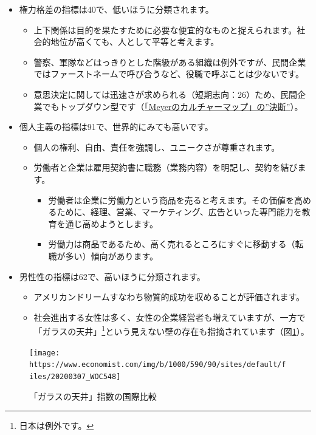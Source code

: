 \documentclass[
]{book}
\begin{document}
\begin{itemize}
\item
  権力格差の指標は40で、低いほうに分類されます。

  \begin{itemize}
  \item
    上下関係は目的を果たすために必要な便宜的なものと捉えられます。社会的地位が高くても、人として平等と考えます。
  \item
    警察、軍隊などはっきりとした階級がある組織は例外ですが、民間企業ではファーストネームで呼び合うなど、役職で呼ぶことは少ないです。
  \item
    意思決定に関しては迅速さが求められる（短期志向：26）ため、民間企業でもトップダウン型です（\protect\hyperlink{meyer}{「Meyerのカルチャーマップ」の''決断''}）。
  \end{itemize}
\item
  個人主義の指標は91で、世界的にみても高いです。

  \begin{itemize}
  \item
    個人の権利、自由、責任を強調し、ユニークさが尊重されます。
  \item
    労働者と企業は雇用契約書に職務（業務内容）を明記し、契約を結びます。

    \begin{itemize}
    \item
      労働者は企業に労働力という商品を売ると考えます。その価値を高めるために、経理、営業、マーケティング、広告といった専門能力を教育を通じ高めようとします。
    \item
      労働力は商品であるため、高く売れるところにすぐに移動する（転職が多い）傾向があります。
    \end{itemize}
  \end{itemize}
\item
  男性性の指標は62で、高いほうに分類されます。

  \begin{itemize}
  \item
    アメリカンドリームすなわち物質的成功を収めることが評価されます。
  \item
    社会進出する女性は多く、女性の企業経営者も増えていますが、一方で「ガラスの天井」\footnote{日本は例外です。}という見えない壁の存在も指摘されています（図\ref{fig:glassceiling}）。
  \end{itemize}
\end{itemize}

\begin{figure}
\texttt{[image: https://www.economist.com/img/b/1000/590/90/sites/default/files/20200307\_WOC548]} \caption{「ガラスの天井」指数の国際比較}\label{fig:glassceiling}
\end{figure}
\end{document}
